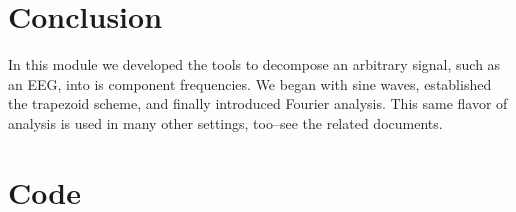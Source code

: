 \documentclass{article}
\begin{document}
\section{Conclusion}
In this module we developed the tools to decompose an arbitrary signal, such as an EEG, into is component frequencies.  We began with sine waves, established the trapezoid scheme, and finally introduced Fourier analysis.  This same flavor of analysis is used in many other settings, too--see the related documents. 








\section{Code}
\end{document}
